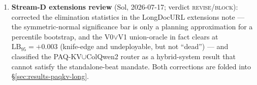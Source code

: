 \documentclass[11pt,letterpaper]{article}
\newcommand{\paqc}{\textsc{PAQ-KV}}
\newcommand{\lb}{\mathrm{LB}_{95}}
\begin{document}
\begin{enumerate}
        frozen instrument, and the oracle definition. Every mechanistic check passed; one
        over-claim was \textbf{corrected} (``exceeds the gold-page oracle'' $\to$
        ``matches''), and the audit's named residual risk --- sample size --- was retired by
        the 80-document top-up (\S\ref{sec:results-paqkv-mmlo}).
  \item \textbf{Stream-D extensions review} (Sol, 2026-07-17; verdict \textsc{revise/block}):
        corrected the elimination statistics in the LongDocURL extensions note --- the
        symmetric-normal significance bar is only a planning approximation for a percentile
        bootstrap, and the V0$\vee$V1 union-oracle in fact clears at $\lb=+0.003$ (knife-edge
        and undeployable, but not ``dead'') --- and classified the \paqc{}$\cup$ColQwen2
        router as a hybrid-system result that cannot satisfy the standalone-beat mandate.
        Both corrections are folded into \S\ref{sec:results-paqkv-long}.
\end{enumerate}
\end{document}
